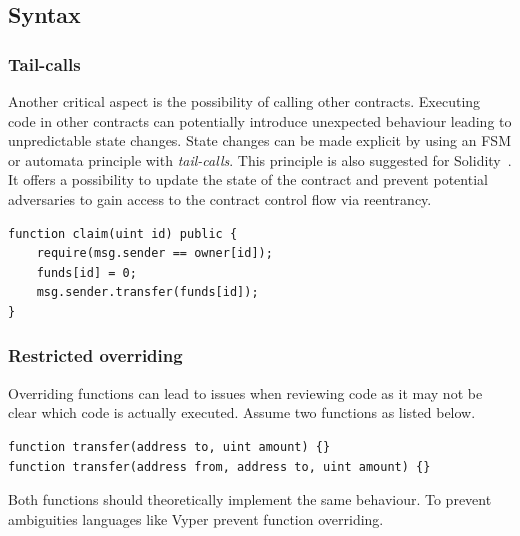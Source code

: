 \subsection{Syntax}
\subsubsection{Tail-calls}
Another critical aspect is the possibility of calling other contracts. Executing code in other contracts can potentially introduce unexpected behaviour leading to unpredictable state changes. State changes can be made explicit by using an FSM or automata principle with \emph{tail-calls}. This principle is also suggested for Solidity~\cite{ConsenSys2018Security}.
It offers a possibility to update the state of the contract and prevent potential adversaries to gain access to the contract control flow via reentrancy.

\begin{lstlisting}[caption={Tail calls implemented in Solidity.},label=lst:tail-call,language=Solidity]
function claim(uint id) public {
    require(msg.sender == owner[id]);
    funds[id] = 0;
    msg.sender.transfer(funds[id]);
}
\end{lstlisting}



\subsubsection{Restricted overriding}
Overriding functions can lead to issues when reviewing code as it may not be clear which code is actually executed. Assume two functions as listed below.
\begin{lstlisting}[caption={Function overriding with different inputs.},label=lst:tail-call,language=Solidity]
function transfer(address to, uint amount) {}
function transfer(address from, address to, uint amount) {}
\end{lstlisting}
Both functions should theoretically implement the same behaviour. To prevent ambiguities languages like Vyper prevent function overriding.


